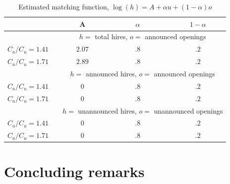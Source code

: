 \documentclass[11pt,article]{memoir}
\begin{document}
\begin{table}[htbp]
\caption{Estimated matching function, $\log(h)=A+\alpha u+(1-\alpha) o$}
\label{tab:perceived_A}
\begin{tabularx}{\textwidth}{cXcXcXc}
 \hline
  $ $ & & A & & $\alpha$ & & $1-\alpha$   \\ 
  \hline 
  & &  \multicolumn{5}{c}{$h=$ total hires, $o=$ announced openings} \\
  \hline 
   $C_a/C_u=1.41$ & & $2.07$ & &  $.8$ & & $.2$    \\ 
   $C_a/C_u=1.71$  & & $2.89$ & &  $.8$ & & $.2$          \\ 
 \hline 
   & &  \multicolumn{5}{c}{$h=$ announced hires, $o=$ announced openings} \\
	   $C_a/C_u=1.41$ & & $0$ & &  $.8$ & & $.2$    \\ 
   $C_a/C_u=1.71$  & & $0$ & &  $.8$ & & $.2$          \\ 
  \hline 
 & &  \multicolumn{5}{c}{$h=$ unannounced hires, $o=$ unannounced openings} \\
	   $C_a/C_u=1.41$ & & $0$ & &  $.8$ & & $.2$    \\ 
   $C_a/C_u=1.71$  & & $0$ & &  $.8$ & & $.2$          \\ 
\end{tabularx}
\end{table}


%


\section{Concluding remarks}
\label{sec:conclusion}
\end{document}

